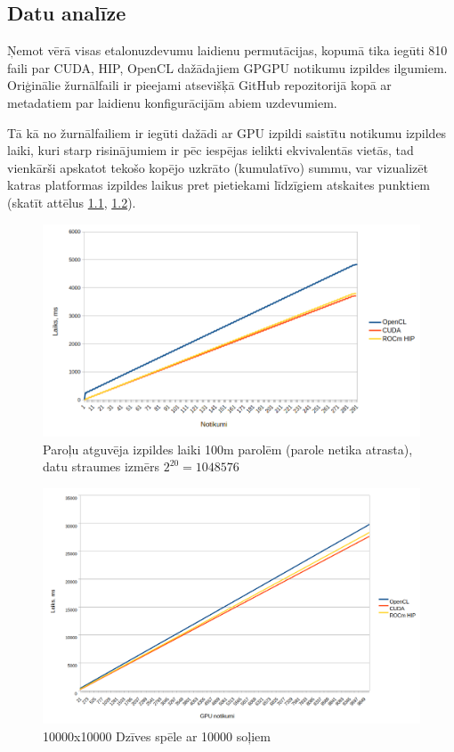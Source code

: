 \begin{center}
    \chapter{Datu analīze}
\end{center}

Ņemot vērā visas etalonuzdevumu laidienu permutācijas, kopumā tika iegūti 810
faili par CUDA, HIP, OpenCL dažādajiem GPGPU notikumu izpildes ilgumiem.
Oriģinālie žurnālfaili ir pieejami atsevišķā GitHub repozitorijā kopā
ar metadatiem par laidienu konfigurācijām abiem uzdevumiem.
\cite{bak_github_repo_log}

Tā kā no žurnālfailiem ir iegūti dažādi ar GPU izpildi saistītu notikumu
izpildes laiki, kuri starp risinājumiem ir pēc iespējas ielikti ekvivalentās
vietās, tad vienkārši apskatot tekošo kopējo uzkrāto (kumulatīvo) summu,
var vizualizēt katras platformas izpildes laikus pret pietiekami
līdzīgiem atskaites punktiem (skatīt attēlus \ref{img:sha256_100m_not_found_cum},
\ref{img:gol_10k10k_10k_steps_cum}).

\begin{figure}[H]
    \centering
    \includegraphics[width=\textwidth]{images/sha256_100m_not_found.png}
    \caption{Paroļu atguvēja izpildes laiki 100m parolēm (parole netika
    atrasta), datu straumes izmērs \( 2^{20} = 1048576\)}
    \label{img:sha256_100m_not_found_cum}
\end{figure}

\begin{figure}[H]
    \centering
    \includegraphics[width=\textwidth]{images/gol_10k_by_10k_10ksteps.png}
    \caption{10000x10000 Dzīves spēle ar 10000 soļiem}
    \label{img:gol_10k10k_10k_steps_cum}
\end{figure}

